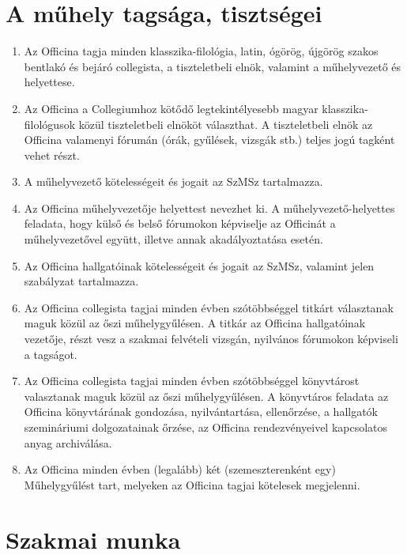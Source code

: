\documentclass{rulebook}
\begin{document}
\section{A műhely tagsága, tisztségei}

\begin{enumerate}
	\item Az Officina tagja minden klasszika-filológia, latin, ógörög, újgörög szakos bentlakó és bejáró collegista, a tiszteletbeli elnök, valamint a műhelyvezető és helyettese.
	\item Az Officina a Collegiumhoz kötődő legtekintélyesebb magyar klasszika-filológusok közül tiszteletbeli elnököt választhat. A tiszteletbeli elnök az Officina valamenyi fórumán (órák, gyűlések, vizsgák stb.) teljes jogú tagként vehet részt.
	\item A műhelyvezető kötelességeit és jogait az SzMSz tartalmazza.
	\item Az Officina műhelyvezetője helyettest nevezhet ki. A műhelyvezető-helyettes feladata, hogy külső és belső fórumokon képviselje az Officinát a műhelyvezetővel együtt, illetve annak akadályoztatása esetén.
	\item Az Officina hallgatóinak kötelességeit és jogait az SzMSz, valamint jelen szabályzat tartalmazza. 
	\item Az Officina collegista tagjai minden évben szótöbbséggel titkárt választanak maguk közül az őszi műhelygyűlésen. A titkár az Officina hallgatóinak vezetője, részt vesz a szakmai felvételi vizsgán, nyilvános fórumokon képviseli a tagságot.
	\item Az Officina collegista tagjai minden évben szótöbbséggel könyvtárost valasztanak maguk közül az őszi műhelygyűlésen. A könyvtáros feladata az Officina könyvtárának gondozása, nyilvántartása, ellenőrzése, a hallgatók szemináriumi dolgozatainak őrzése, az Officina rendezvényeivel kapcsolatos anyag archiválása.
	\item Az Officina minden évben (legalább) két (szemeszterenként egy) Műhelygyűlést tart, melyeken az Officina tagjai kötelesek megjelenni.
\end{enumerate}


\section{Szakmai munka}
\end{document}
